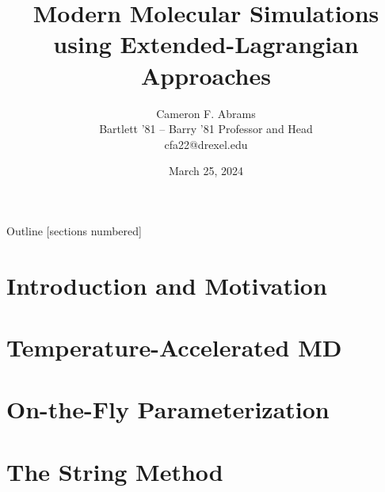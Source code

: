 \documentclass[10pt]{beamer}
\title{Modern Molecular Simulations using Extended-Lagrangian Approaches}
\date{March 25, 2024}
\author{Cameron F. Abrams\\Bartlett '81 -- Barry '81 Professor and Head\\cfa22@drexel.edu}
\institute{Drexel University, Department of Chemical and Biological Engineering}
\begin{document}
\maketitle

\begin{frame}{Outline}
  [sections numbered]
  \tableofcontents[hideallsubsections]
\end{frame}

\section{Introduction and Motivation}













\section{Temperature-Accelerated MD}





\section{On-the-Fly Parameterization}











% 

\section{The String Method}








\end{document}
